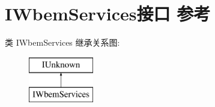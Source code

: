 \hypertarget{interface_i_wbem_services}{}\section{I\+Wbem\+Services接口 参考}
\label{interface_i_wbem_services}
类 I\+Wbem\+Services 继承关系图\+:\begin{figure}[H]
\begin{center}
\leavevmode
\includegraphics[height=2.000000cm]{interface_i_wbem_services}
\end{center}
\end{figure}

